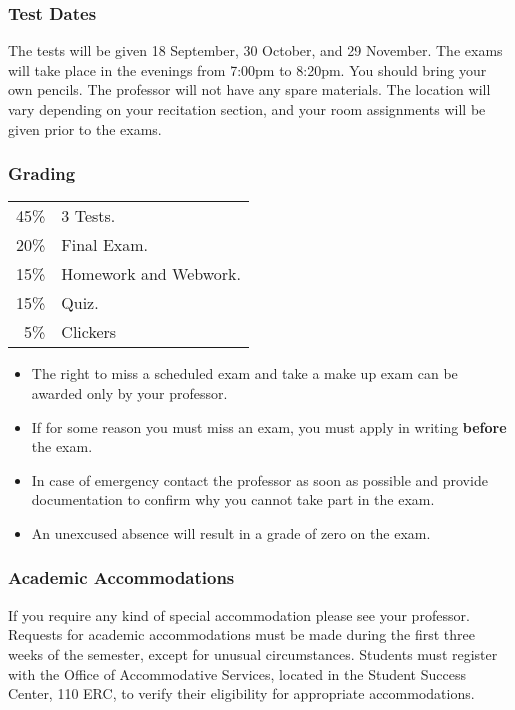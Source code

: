 \begin{frame}
  \frametitle{Test Dates}

   The tests will be given 18 September, 30 October,
  and 29 November. The exams will take place in the evenings from
  7:00pm to 8:20pm. You should bring your own pencils.  The professor
  will not have any spare materials. The location will vary depending
  on your recitation section, and your room assignments will be given
  prior to the exams.
  
\end{frame}


\begin{frame}
  \frametitle{Grading}

   \begin{tabular}[t]{rl}
    45\% & 3 Tests. \\
    20\% & Final Exam. \\
    15\% & Homework and Webwork. \\
    15\% & Quiz. \\
     5\% & Clickers
  \end{tabular}

  \begin{itemize}
  \item The right to miss a scheduled exam and take a make up exam can
    be awarded only by your professor.
  \item If for some reason you must miss an exam, you must apply in
    writing {\bf before} the exam.
  \item In case of emergency contact the professor as soon as possible
    and provide documentation to confirm why you cannot take part in
    the exam. 
  \item An unexcused absence will result in a grade of zero on the
    exam.
  \end{itemize}


  
\end{frame}


\begin{frame}
  \frametitle{Academic Accommodations}

  If you require any kind of special
  accommodation please see your professor.  Requests for academic
  accommodations must be made during the first three weeks of the
  semester, except for unusual circumstances.  Students must register
  with the Office of Accommodative Services, located in the Student
  Success Center, 110 ERC, to verify their eligibility for appropriate
  accommodations.
  
\end{frame}

